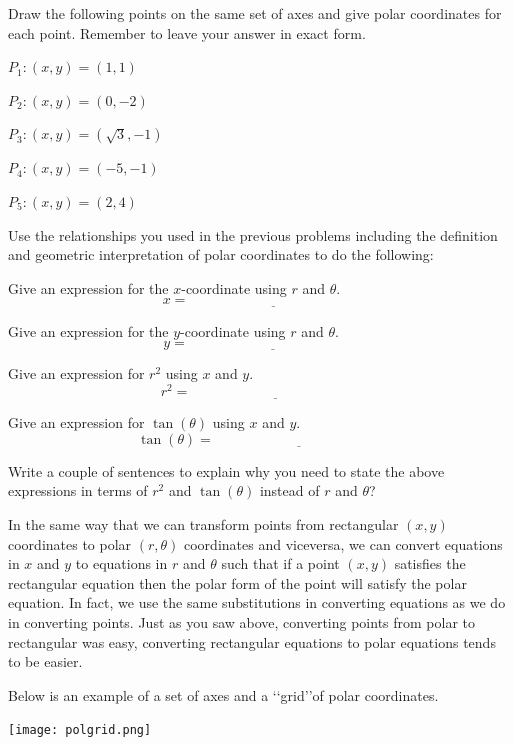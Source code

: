 \bq Draw the following points on the same set of axes and give polar coordinates for each point. Remember to leave your answer in exact form.
\be
\item $P_1:(x,y)=(1,1) $
\item $P_2:(x,y)=(0,-2)$
\item $P_3:(x,y)=(\sqrt{3}, -1)$
\item $P_4:(x,y)=(-5,-1)$
\item $P_5:(x,y)=(2,4)$
\ee
\eq

\bq \label{q55}Use the relationships you used in the previous problems including the definition and geometric interpretation of polar coordinates to do the following:
\be \item Give an expression for the $x$-coordinate using $r$ and $\theta$.
$$ x = \underline{\hspace{2in}} $$
\item Give an expression for the $y$-coordinate using $r$ and $\theta$.
$$ y = \underline{\hspace{2in}} $$
\item Give an expression for $r^2$ using $x$ and $y$.
$$ r^2 = \underline{\hspace{2in}} $$
\item Give an expression for $\tan(\theta)$ using $x$ and $y$.
$$ \tan(\theta) = \underline{\hspace{2in}} $$
\item Write a couple of sentences to explain why you need to state the above expressions in terms of $r^2$ and $\tan(\theta)$ instead of $r$ and $\theta$?
\ee \eq

In the same way that we can transform points from rectangular $(x,y)$ coordinates to polar $(r,\theta)$ coordinates and viceversa, we can convert equations in $x$ and $y$ to equations in $r$ and $\theta$ such that if a point $(x,y)$ satisfies the rectangular equation then the polar form of the point will satisfy the polar equation. In fact, we use the same substitutions in converting equations as we do in converting points. Just as you saw above, converting points from polar to rectangular was easy, converting rectangular equations to polar equations tends to be easier.

Below is an example of a set of axes and a \lq\lq{grid}\rq\rq of polar coordinates.
\begin{center} \texttt{[image: polgrid.png]} \end{center}

